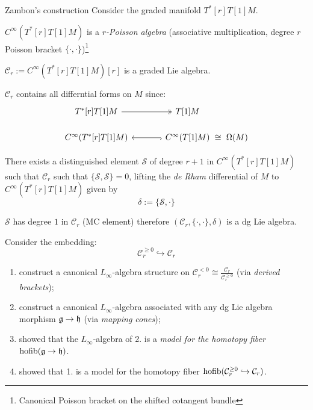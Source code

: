 \documentclass[beamer,10pt]{standalone}
\begin{document}
\begin{frame}{Zambon's construction}
	Consider the graded manifold $T^*[r]T[1]M$.
	\vfill

	$C^\infty(T^*[r]T[1]M)$ is a \emph{$r$-Poisson algebra} (associative multiplication, degree $r$ Poisson bracket $\lbrace \cdot,\cdot\rbrace$)\footnote{Canonical Poisson bracket on the shifted cotangent bundle}
	\vfill

	$\mathcal{C}_r := C^\infty(T^*[r]T[1]M)[r]$ is a graded Lie algebra.
	\vfill

	$\mathcal{C}_r$ contains all differntial forms on $M$ since:
	\begin{displaymath}
		\begin{tikzcd}[ampersand replacement=\&,column sep = large]
			T^*[r]T[1]M \ar[r, two heads,] \& T[1]M \&[-2.5em] \\[-.5em]
			C^\infty(T^*[r]T[1]M) \& C^\infty(T[1]M) \ar[l,hook]\ar[r,phantom,"\cong"] \& \Omega(M) 
 		\end{tikzcd}
	\end{displaymath}
\end{frame}

\begin{frame}
	There exists a distinguished element $\mathcal{S}$ of degree $r+1$ in $C^\infty(T^*[r]T[1]M)$ such that $\mathcal{C}_r$ such that $\lbrace \mathcal{S},\mathcal{S}\rbrace =0 $, lifting the \emph{de Rham} differential of $M$ to $C^\infty(T^*[r]T[1]M)$ given by 
	$$ \delta := \lbrace \mathcal{S},\cdot \rbrace$$
	\vfill

	$\mathcal{S}$ has degree $1$ in $\mathcal{C}_r$ (MC element) therefore $(\mathcal{C}_r,\lbrace \cdot,\cdot\rbrace,\delta)$ is a dg Lie algebra.
	\vfill

	Consider the embedding: $$ \mathcal{C}_r^{\geq 0} \hookrightarrow \mathcal{C}_r$$
	\begin{enumerate}
		\item \cite{Getzler1991} construct a canonical $L_\infty$-algebra structure on $\mathcal{C}_r^{<0}\cong \frac{\mathcal{C}_r }{\mathcal{C}_r^{\geq 0}}$ (via \emph{derived brackets});
		\item \cite{Fiorenza2006} construct a canonical $L_\infty$-algebra associated with any dg Lie algebra morphism $\mathfrak{g} \to \mathfrak{h}$ (via \emph{mapping cones});
		\item \cite{Pridham2010a} showed that the $L_\infty$-algebra  of 2. is a \emph{model for the homotopy fiber $\mathrm{hofib}(\mathfrak{g} \to \mathfrak{h})$}.
		\item \cite{Bandiera2015} showed that 1. is a model for the homotopy fiber $\mathrm{hofib}(\mathcal{C}_r^{\geq 0} \hookrightarrow \mathcal{C}_r)$.
	\end{enumerate}
\end{frame}
\end{document}
